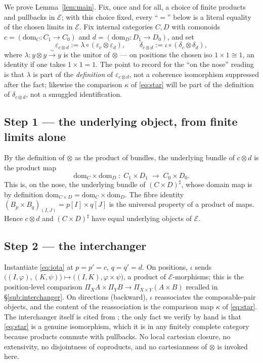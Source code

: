 \documentclass[11pt]{amsart}
\theoremstyle{plain}
\theoremstyle{definition}
\theoremstyle{remark}
\newcommand{\Ee}{\mathcal{E}}
\newcommand{\dir}[1]{[#1]}
\newcommand{\sharpc}[1]{#1^{\sharp}}   %
\newcommand{\dom}{\mathrm{dom}}
\begin{document}
We prove Lemma~\ref{lem:main}. Fix, once and for all, a choice of finite products and pullbacks in
$\Ee$; with this choice fixed, every ``$=$'' below is a literal equality of the chosen limits in
$\Ee$. Fix internal categories $C,D$ with comonoids $c=(\dom_C:C_1\to C_0)$ and
$d=(\dom_D:D_1\to D_0)$, and set
\[
  \varepsilon_{c\otimes d}:=\lambda\circ(\varepsilon_c\otimes\varepsilon_d),
  \qquad
  \delta_{c\otimes d}:=\iota\circ(\delta_c\otimes\delta_d),
\]
where $\lambda:y\otimes y\xrightarrow{\ \sim\ }y$ is the unitor of $\otimes$ --- on positions the
chosen iso $1\times1\cong1$, an identity if one takes $1\times1=1$. The point to record for the
``on the nose'' reading is that $\lambda$ is part of the \emph{definition} of
$\varepsilon_{c\otimes d}$, not a coherence isomorphism suppressed after the fact; likewise the
comparison $\kappa$ of \eqref{eq:star} will be part of the definition of $\delta_{c\otimes d}$, not a
smuggled identification.

\subsection*{Step 1 --- the underlying object, from finite limits alone}

By the definition of $\otimes$ as the product of bundles, the underlying bundle of $c\otimes d$ is
the product map
\[
  \dom_C\times\dom_D\;:\;C_1\times D_1\;\longrightarrow\;C_0\times D_0 .
\]
This is, on the nose, the underlying bundle of $\sharpc{(C\times D)}$, whose domain map is by
definition $\dom_{C\times D}=\dom_C\times\dom_D$. The fibre identity
$(B_p\times B_q)_{(I,J)}=p\dir{I}\times q\dir{J}$ is the universal property of a product of maps.
Hence $c\otimes d$ and $\sharpc{(C\times D)}$ have equal underlying objects of $\Ee$.

\subsection*{Step 2 --- the interchanger}

Instantiate \eqref{eq:iota} at $p=p'=c$, $q=q'=d$. On positions, $\iota$ sends
$\big((I,\varphi),(K,\psi)\big)\mapsto\big((I,K),\varphi\times\psi\big)$, a product of $\Ee$-morphisms;
this is the position-level comparison $\Pi_X A\times\Pi_Y B\to\Pi_{X\times Y}(A\times B)$ recalled in
\S\ref{sub:interchanger}. On directions (backward), $\iota$ reassociates the composable-pair objects,
and the content of the reassociation is the comparison map $\kappa$ of \eqref{eq:star}. The interchanger
itself is cited from \cite[Thm.~4.5]{ShapiroSpivak2023}; the only fact we verify by hand is that
\eqref{eq:star} is a genuine isomorphism, which it is in any finitely complete category because
products commute with pullbacks. No local cartesian closure, no extensivity, no disjointness of
coproducts, and no cartesianness of $\otimes$ is invoked here.
\end{document}
